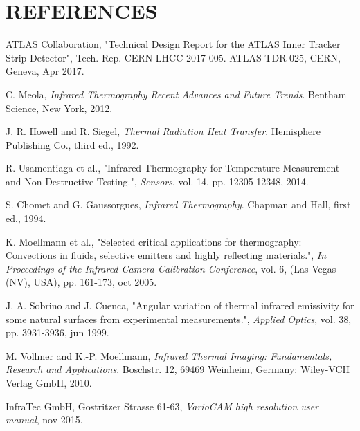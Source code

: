 \pagestyle{references}

\section*{\uppercase{References}}\label{referen}
	\bigskip
	\bigskip
	\begin{enumerate}[label={[\arabic*]}]
	
		\item ATLAS Collaboration, "Technical Design Report for the ATLAS Inner Tracker Strip Detector", Tech. Rep. CERN-LHCC-2017-005. ATLAS-TDR-025, CERN, Geneva, Apr 2017.\label{ref1}
		
		\item C. Meola,	\textit{Infrared Thermography Recent Advances and Future Trends}. Bentham Science, New York, 2012.\label{ref2}
		
		\item J. R. Howell and R. Siegel, \textit{Thermal Radiation Heat Transfer}. Hemisphere Publishing Co., third ed., 1992.\label{ref3}
		
		\item R. Usamentiaga et al., "Infrared Thermography for Temperature Measurement and Non-Destructive Testing.", \textit{Sensors}, vol. 14, pp. 12305-12348, 2014.\label{ref4}
		 
		\item S. Chomet and G. Gaussorgues, \textit{Infrared Thermography}. Chapman and Hall, first ed., 1994.\label{ref5}
		
		\item K. Moellmann et al., "Selected critical applications for thermography: Convections in fluids, selective emitters and highly reflecting materials.", \textit{In Proceedings of the Infrared Camera Calibration Conference}, vol. 6, (Las Vegas (NV), USA), pp. 161-173, oct 2005.\label{ref6}
		
		\item J. A. Sobrino and J. Cuenca, "Angular variation of thermal infrared emissivity for some natural surfaces from experimental measurements.", \textit{Applied Optics}, vol. 38, pp. 3931-3936, jun 1999.\label{ref7}
		
		\item M. Vollmer and K.-P. Moellmann,	\textit{Infrared Thermal Imaging: Fundamentals, Research and Applications}. Boschstr. 12, 69469 Weinheim, Germany: Wiley-VCH Verlag GmbH, 2010.\label{ref8}
		
		\item InfraTec GmbH, Gostritzer Strasse 61-63, \textit{VarioCAM \textregistered\space high resolution user manual}, nov 2015.\label{ref9}
		

\end{enumerate}
